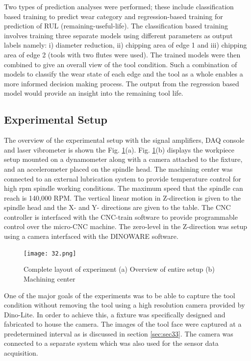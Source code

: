 \documentclass[preprint,review,12pt]{elsarticle}
\begin{document}
Two types of prediction analyses were performed; these include classification based training to predict wear category and regression-based training for prediction of RUL (remaining-useful-life). The classification based training involves training three separate models using different parameters as output labels namely: i) diameter reduction, ii) chipping area of edge 1 and iii) chipping area of edge 2 (tools with two flutes were used). The trained models were then combined to give an overall view of the tool condition. Such a combination of models to classify the wear state of each edge and the tool as a whole enables a more informed decision making process. The output from the regression based model would provide an insight into the remaining tool life. \par

\subsection{Experimental Setup}\label{sec:sec32}
The overview of the experimental setup with the signal amplifiers, DAQ console and laser vibrometer is shown the Fig. \ref{fig:fig32}(a). Fig. \ref{fig:fig32}(b) displays the workpiece setup mounted on a dynamometer along with a camera attached to the fixture, and an accelerometer placed on the spindle head. The machining center was connected to an external lubrication system to provide temperature control for high rpm spindle working conditions. The maximum speed that the spindle can reach is 140,000 RPM. The vertical linear motion in Z-direction is given to the spindle head and the X- and Y- directions are given to the table. The CNC controller is interfaced with the CNC-train software to provide programmable control over the micro-CNC machine. The zero-level in the Z-direction was setup using a camera interfaced with the DINOWARE software. \par

\begin{figure}[!h]
\begin{center}
\texttt{[image: 32.png]}
\caption{Complete layout of experiment (a) Overview of entire setup (b) Machining center}\label{fig:fig32}
\end{center}
\end{figure}

 One of the major goals of the experiments was to be able to capture the tool condition without removing the tool using a high resolution camera provided by Dino-Lite. In order to achieve this, a fixture was specifically designed and fabricated to house the camera. The images of the tool face were captured at a predetermined interval as is discussed in section \ref{sec:sec33}. The camera was connected to a separate system which was also used for the sensor data acquisition. \par
\end{document}
